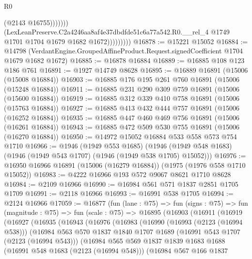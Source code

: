 \begin{lexlean}{R0}
\begin{coremodule}
                                (@2143 @16755)))))))
                    (LexLeanPreserve.C2a4246aa8af4e37dbdfde51c6a77a542.R0.__rel_4
                      @1749
                      @1701
                      @1704
                      @1679
                      @1682
                      @1672)))))))))
@16878 := @15221 @15052
@16884 := @14798
    (VerdantEngine.GroupedAffineProduct.Request.signedCoefficient @1704 @1679 @1682 @1672)
@16885 := @16878 @16884
@16889 := @16885 @108 @123 @186 @761
@16891 := @1927 @14749 @8628
@16895 := @16889 @16891 (@15006 (@15008 @16884))
@16903 := @16885 @176 @195 @261 @760 @16891 (@15006 (@15248 @16884))
@16911 := @16885 @231 @290 @309 @759 @16891 (@15006 (@15600 @16884))
@16919 := @16885 @312 @339 @410 @758 @16891 (@15006 (@15763 @16884))
@16927 := @16885 @413 @432 @444 @757 @16891 (@15006 (@16252 @16884))
@16935 := @16885 @447 @460 @469 @756 @16891 (@15006 (@16261 @16884))
@16943 := @16885 @472 @509 @530 @755 @16891 (@15006 (@16270 @16884))
@16950 := @14972 @15052 @16884 @533 @558 @573 @754 @1710
@16966 := @1946
    (@1949 @553 @1685)
    (@1946 (@1949 @548 @1683) (@1946 (@1949 @543 @1707) (@1946 (@1949 @538 @1705) @15052)))
@16976 := @16950 @16966 @16891 (@15006 (@16279 @16884)) (@1975 (@1976 @558 @1710 @15052))
@16983 := @4222 @16966 @193 @572 @9067 @8621 @1710 @8628
@16984 := @2109 @16966
@16990 := @16984 @561 @571 @1837 @2851 @1705 @1709
@16991 := @2118 @16966
@16993 := @16991 @538 @1705
@16994 := @2124 @16966
@17059 := @16877
    (fun (lane : @75) =>
    fun (signs : @75) =>
    fun (magnitude : @75) =>
    fun (scale : @75) =>
    @16895
      (@16903
        (@16911
          (@16919
            (@16927
              (@16935
                (@16943
                  (@16976
                    (@16983
                      (@16990
                        (@16993 (@2123 (@16994 @538)))
                        (@16984
                          @563
                          @570
                          @1837
                          @1840
                          @1707
                          @1689
                          (@16991 @543 @1707 (@2123 (@16994 @543)))
                          (@16984
                            @565
                            @569
                            @1837
                            @1839
                            @1683
                            @1688
                            (@16991 @548 @1683 (@2123 (@16994 @548)))
                            (@16984
                              @567
                              @166
                              @1837

\end{coremodule}
\end{lexlean}
